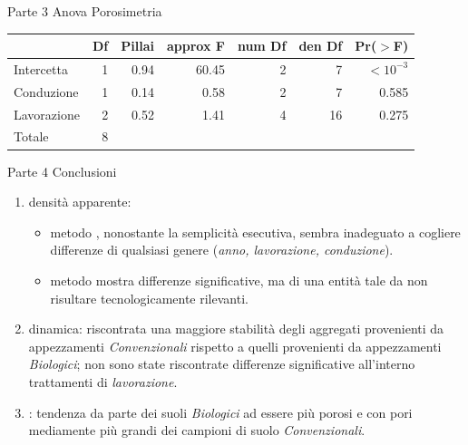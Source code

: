 \documentclass[10pt]{beamer}
\begin{document}
\begin{frame}{Parte 3 \small{Anova Porosimetria}}
  \begin{table}[ht]
    \centering
    \begin{tabular}{lrrrrrr}
      \hline
      & Df & Pillai & approx F & num Df & den Df & Pr($>$F) \\ 
      \hline
      Intercetta & 1 & 0.94 & 60.45 & 2 & 7 & $<10^{-3}$ \\ 
      Conduzione & 1 & 0.14 & 0.58 & 2 & 7 & 0.585 \\ 
      Lavorazione & 2 & 0.52 & 1.41 & 4 & 16 & 0.275 \\ 
      Totale & 8 &  &  &  &  &  \\ 
      \hline
    \end{tabular}
  \end{table}
\end{frame}


\begin{frame}[label=finale]{Parte 4 \small{Conclusioni}}
  \begin{enumerate}[<+->]

  \item densità apparente:
    \begin{itemize}
    \item metodo \hyperlink{Core}{}, nonostante la semplicità esecutiva,
      sembra inadeguato a cogliere differenze di qualsiasi genere
      (\emph{anno, lavorazione, conduzione}).
    \item metodo \hyperlink{Clod}{} mostra differenze significative, ma di
      una entità tale da non risultare tecnologicamente rilevanti.
    \end{itemize}
  \item \hyperlink{distribuzione}{} dinamica: riscontrata una
    maggiore stabilità degli aggregati provenienti da appezzamenti
    \emph{Convenzionali} rispetto a quelli provenienti da appezzamenti
    \emph{Biologici}; non sono state riscontrate differenze significative
    all'interno trattamenti di \emph{lavorazione}.
  \item \hyperlink{Porosimetria}{}: tendenza da parte dei suoli
    \emph{Biologici} ad essere più porosi e con pori mediamente più
    grandi dei campioni di suolo \emph{Convenzionali}.
  \end{enumerate}

\end{frame}
\end{document}
